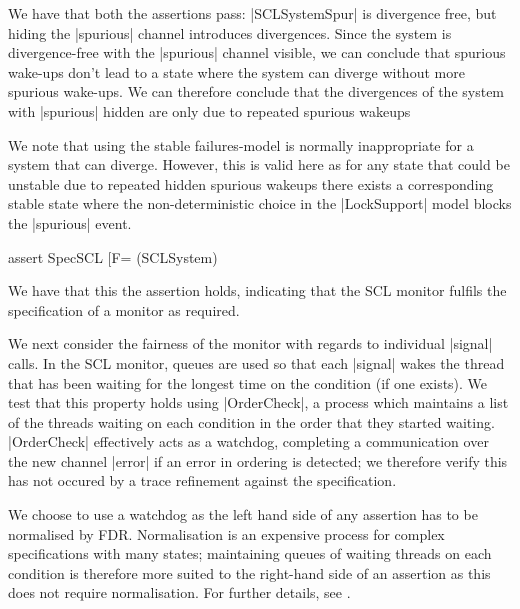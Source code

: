 We have that both the assertions pass: |SCLSystemSpur| is divergence free, but hiding the |spurious| channel introduces divergences. Since the system is divergence-free with the |spurious| channel visible, we can conclude that spurious wake-ups don't lead to a state where the system can diverge without more spurious wake-ups. We can therefore conclude that the divergences of the system with |spurious| hidden are only due to repeated spurious wakeups


We note that using the stable failures-model is normally inappropriate for a system that can diverge. However, this is valid here as for any state that could be unstable due to repeated hidden spurious wakeups there exists a corresponding stable state where the non-deterministic choice in the |LockSupport| model blocks the |spurious| event. 

\begin{cspm}
  assert SpecSCL [F= (SCLSystem) 
\end{cspm}

We have that this the assertion holds, indicating that the SCL monitor fulfils the specification of a monitor as required.

We next consider the fairness of the monitor with regards to individual |signal| calls. In the SCL monitor, queues are used so that each |signal| wakes the thread that has been waiting for the longest time on the condition (if one exists). We test that this property holds using |OrderCheck|, a process which maintains a list of the threads waiting on each condition in the order that they started waiting. |OrderCheck| effectively acts as a watchdog, completing a communication over the new channel |error| if an error in ordering is detected; we therefore verify this has not occured by a trace refinement against the specification. 

We choose to use a watchdog as the left hand side of any assertion has to be normalised by FDR. Normalisation is an expensive process for complex specifications with many states; maintaining queues of waiting threads on each condition is therefore more suited to the right-hand side of an assertion as this does not require normalisation. For further details, see \cite{RoscoeUCS}.

